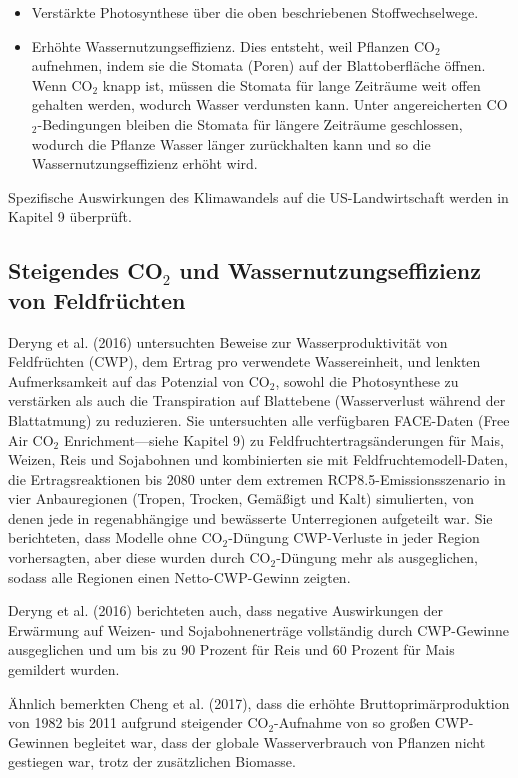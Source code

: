 \documentclass[12pt,paper=a4,DIV=12,parskip=never,chapterprefix=false,headings=standardclasses]{scrreprt}
\begin{document}
\begin{itemize}
\item Verstärkte Photosynthese über die oben beschriebenen Stoffwechselwege.
\item Erhöhte Wassernutzungseffizienz. Dies entsteht, weil Pflanzen CO$_2$ aufnehmen, indem sie die Stomata (Poren) auf der Blattoberfläche öffnen. Wenn CO$_2$ knapp ist, müssen die Stomata für lange Zeiträume weit offen gehalten werden, wodurch Wasser verdunsten kann. Unter angereicherten CO$_2$-Bedingungen bleiben die Stomata für längere Zeiträume geschlossen, wodurch die Pflanze Wasser länger zurückhalten kann und so die Wassernutzungseffizienz erhöht wird.
\end{itemize}

Spezifische Auswirkungen des Klimawandels auf die US-Landwirtschaft werden in Kapitel 9 überprüft.

\subsection{Steigendes CO$_2$ und Wassernutzungseffizienz von Feldfrüchten}

Deryng et al. (2016) untersuchten Beweise zur Wasserproduktivität von Feldfrüchten (CWP), dem Ertrag pro verwendete Wassereinheit, und lenkten Aufmerksamkeit auf das Potenzial von CO$_2$, sowohl die Photosynthese zu verstärken als auch die Transpiration auf Blattebene (Wasserverlust während der Blattatmung) zu reduzieren. Sie untersuchten alle verfügbaren FACE-Daten (Free Air CO$_2$ Enrichment—siehe Kapitel 9) zu Feldfruchtertragsänderungen für Mais, Weizen, Reis und Sojabohnen und kombinierten sie mit Feldfruchtemodell-Daten, die Ertragsreaktionen bis 2080 unter dem extremen RCP8.5-Emissionsszenario in vier Anbauregionen (Tropen, Trocken, Gemäßigt und Kalt) simulierten, von denen jede in regenabhängige und bewässerte Unterregionen aufgeteilt war. Sie berichteten, dass Modelle ohne CO$_2$-Düngung CWP-Verluste in jeder Region vorhersagten, aber diese wurden durch CO$_2$-Düngung mehr als ausgeglichen, sodass alle Regionen einen Netto-CWP-Gewinn zeigten.

Deryng et al. (2016) berichteten auch, dass negative Auswirkungen der Erwärmung auf Weizen- und Sojabohnenerträge vollständig durch CWP-Gewinne ausgeglichen und um bis zu 90 Prozent für Reis und 60 Prozent für Mais gemildert wurden.

Ähnlich bemerkten Cheng et al. (2017), dass die erhöhte Bruttoprimärproduktion von 1982 bis 2011 aufgrund steigender CO$_2$-Aufnahme von so großen CWP-Gewinnen begleitet war, dass der globale Wasserverbrauch von Pflanzen nicht gestiegen war, trotz der zusätzlichen Biomasse.
\end{document}
